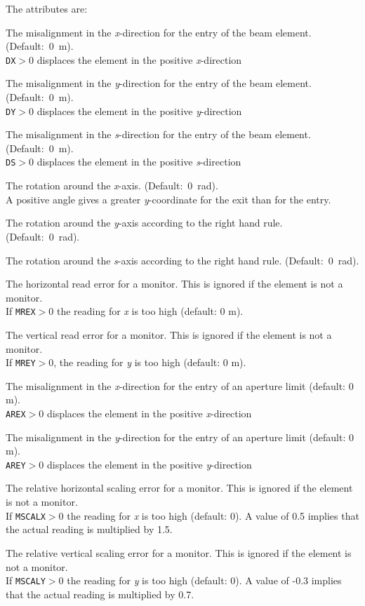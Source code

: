 The attributes are: 
\begin{madlist}
   The misalignment in the {\it x}-direction for the entry of
  the beam element. (Default:~0~m).  \\ 
  {\tt DX}$>$0 displaces the element in the positive {\it x}-direction 
  
   The misalignment in the {\it y}-direction for the entry of
  the beam element. (Default:~0~m). \\
  {\tt DY}$>$0 displaces the element in the positive {\it y}-direction 

   The misalignment in the {\it s}-direction for the entry of
  the beam element. (Default:~0~m). \\
  {\tt DS}$>$0 displaces the element in the positive {\it s}-direction 
  
   The rotation around the {\it x}-axis. (Default:~0~rad). \\ 
  A positive angle gives a greater {\it y}-coordinate for the exit
  than for the entry. 

   The rotation around the {\it y}-axis according to the
  right hand rule. (Default:~0~rad).  

   The rotation around the {\it s}-axis according to the
  right hand rule. (Default:~0~rad).  

   The horizontal read error for a monitor. This is ignored if
  the element is not a monitor. \\
  If {\tt MREX}$>$0 the reading for {\it x} is too high (default: 0 m). 

   The vertical read error for a monitor. This is ignored if
  the element is not a monitor. \\  
  If {\tt MREY}$>$0, the reading for {\it y} is too high (default: 0 m). 

   The misalignment in the {\it x}-direction for the entry
  of an aperture limit (default: 0 m). \\ 
  {\tt AREX}$>$0 displaces the element in the positive {\it x}-direction 

   The misalignment in the {\it y}-direction for the entry
  of an aperture limit (default: 0 m). \\ 
  {\tt AREY}$>$0 displaces the element in the positive {\it y}-direction 

   The relative horizontal scaling error for a monitor. This
  is ignored if the element is not a monitor. \\ 
  If {\tt MSCALX}$>$0 the reading for {\it x} is too high (default: 0). A
  value of 0.5 implies that the actual reading is multiplied by 1.5.  

   The relative vertical scaling error for a monitor. This is
  ignored if the element is not a monitor. \\  
  If {\tt MSCALY}$>$0 the reading for {\it y} is too high (default: 0). A
  value of -0.3 implies that the actual reading is multiplied by 0.7.  
\end{madlist}


